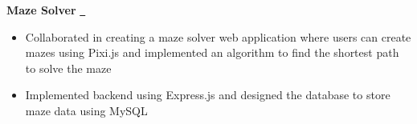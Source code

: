 \textbf{Maze Solver} \href{https://github.com/kevinmu4587/Maze-Maker}{\github\ } \par
\begin{itemize}
	\item Collaborated in creating a maze solver web application where users can create mazes using Pixi.js and implemented an algorithm to find the shortest path to solve the maze
	\item Implemented backend using Express.js and designed the database to store maze data using MySQL
\end{itemize}
\vspace{0.1cm} \par

